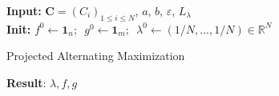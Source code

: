 \begin{algorithm}[ht!]
\SetAlgoLined
\textbf{Input:} $\mathbf{C}=(C_i)_{1\leq i\leq N}$, $a$, $b$, $\varepsilon$, $L_{\lambda}$\\
\textbf{Init:} $f^0\leftarrow \mathbf{1}_n\text{;  }$ $g^0 \leftarrow \mathbf{1}_m\text{;  }$ $\lambda^0 \leftarrow (1/N,...,1/N)\in\mathbb{R}^N$\\
\caption{Projected Alternating Maximization \label{algo:Proj-Sinkhorn}}
\textbf{Result}: $\lambda,f,g$
\end{algorithm}


